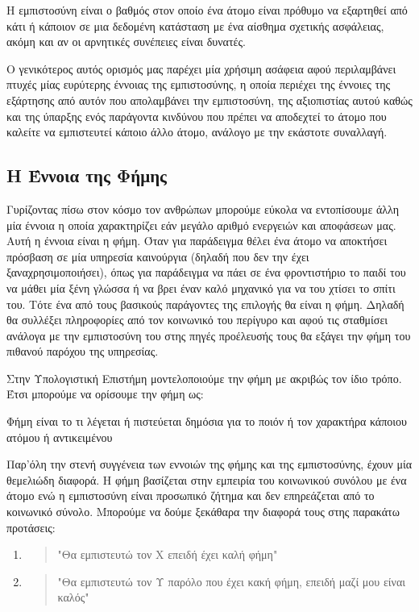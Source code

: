 \begin{decision}
Η εμπιστοσύνη είναι ο βαθμός στον οποίο ένα άτομο είναι πρόθυμο να εξαρτηθεί από κάτι ή κάποιον σε μια δεδομένη κατάσταση με ένα αίσθημα σχετικής ασφάλειας, ακόμη και αν οι αρνητικές συνέπειες είναι δυνατές.
\end{decision}

Ο γενικότερος αυτός ορισμός μας παρέχει μία χρήσιμη ασάφεια αφού περιλαμβάνει πτυχές μίας ευρύτερης έννοιας της εμπιστοσύνης, η οποία περιέχει της έννοιες της εξάρτησης από αυτόν που απολαμβάνει την εμπιστοσύνη, της αξιοπιστίας αυτού καθώς και της ύπαρξης ενός παράγοντα κινδύνου που πρέπει να αποδεχτεί το άτομο που καλείτε να εμπιστευτεί κάποιο άλλο άτομο, ανάλογο με την εκάστοτε συναλλαγή.

\subsection{Η Έννοια της Φήμης}

Γυρίζοντας πίσω στον κόσμο τον ανθρώπων μπορούμε εύκολα να εντοπίσουμε άλλη μία έννοια η οποία χαρακτηρίζει εάν μεγάλο αριθμό ενεργειών και αποφάσεων μας. Αυτή η έννοια είναι η φήμη. Όταν για παράδειγμα θέλει ένα άτομο να αποκτήσει πρόσβαση σε μία υπηρεσία καινούργια (δηλαδή που δεν την έχει ξαναχρησιμοποιήσει), όπως για παράδειγμα να πάει σε ένα φροντιστήριο το παιδί του να μάθει μία ξένη γλώσσα ή να βρει έναν καλό μηχανικό για να του χτίσει το σπίτι του. Τότε ένα από τους βασικούς παράγοντες της επιλογής θα είναι η φήμη. Δηλαδή θα συλλέξει πληροφορίες από τον κοινωνικό του περίγυρο και αφού τις σταθμίσει ανάλογα με την εμπιστοσύνη του στης πηγές προέλευσής τους θα εξάγει την φήμη του πιθανού παρόχου της υπηρεσίας.
\newpage

Στην Υπολογιστική Επιστήμη μοντελοποιούμε την φήμη με ακριβώς τον ίδιο τρόπο. Έτσι μπορούμε να ορίσουμε την φήμη ως:
\begin{reputation}
Φήμη είναι το τι λέγεται ή πιστεύεται δημόσια για το ποιόν ή τον χαρακτήρα κάποιου ατόμου ή αντικειμένου
\end{reputation}

Παρ'όλη την στενή συγγένεια των εννοιών της φήμης και της εμπιστοσύνης, έχουν μία θεμελιώδη διαφορά. Η φήμη βασίζεται στην εμπειρία του κοινωνικού συνόλου με ένα άτομο ενώ η εμπιστοσύνη είναι προσωπικό ζήτημα και δεν επηρεάζεται από το κοινωνικό σύνολο. Μπορούμε να δούμε ξεκάθαρα την διαφορά τους στης παρακάτω προτάσεις:
\begin{enumerate}
\item \begin{quote} 
"Θα εμπιστευτώ τον Χ επειδή έχει καλή φήμη"
\end{quote}
\item \begin{quote}
 "Θα εμπιστευτώ τον Υ παρόλο που έχει κακή φήμη, επειδή μαζί μου είναι καλός"
\end{quote}
\end{enumerate}

